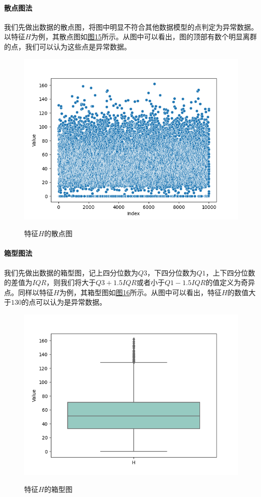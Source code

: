 \documentclass[UTF8]{ctexart}
\begin{document}
	\paragraph{散点图法} 我们先做出数据的散点图，将图中明显不符合其他数据模型的点判定为异常数据。以特征$H$为例，其散点图如\hyperref[Fig.15]{图15}所示。从图中可以看出，图的顶部有数个明显离群的点，我们可以认为这些点是异常数据。
	
	\begin{figure}[htbp]
		\centering
		\caption{特征$H$的散点图}
		\includegraphics[width=1.0\textwidth]{scatter_h.png}
		\label{Fig.15}
	\end{figure}
	
	\paragraph{箱型图法} 我们先做出数据的箱型图，记上四分位数为$Q3$，下四分位数为$Q1$，上下四分位数的差值为$IQR$，则我们将大于$Q3+1.5IQR$或者小于$Q1-1.5IQR$的值定义为奇异点。同样以特征$H$为例，其箱型图如\hyperref[Fig.16]{图16}所示。从图中可以看出，特征$H$的数值大于$130$的点可以认为是异常数据。
	
	\begin{figure}[htbp]
		\centering
		\caption{特征$H$的箱型图}
		\includegraphics[width=1.0\textwidth]{box_h.png}
		\label{Fig.16}
	\end{figure}
	
\end{document}
